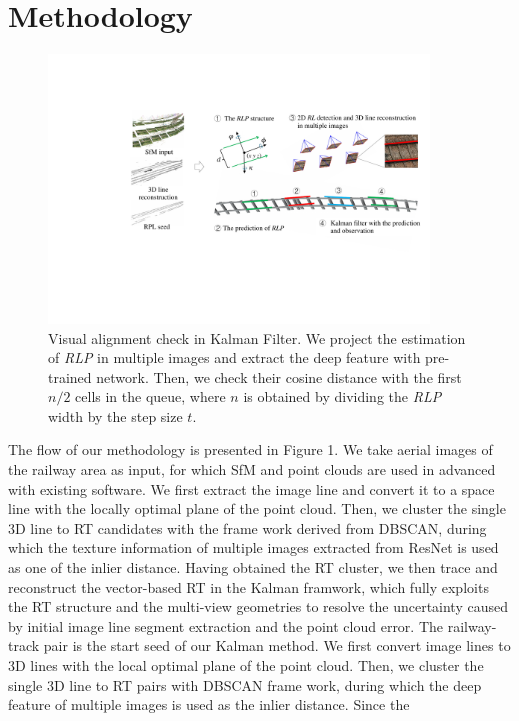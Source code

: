 \section{Methodology}
\begin{figure}
    \centering
    \includegraphics[width=0.9\textwidth]{images/overview.pdf}
    \caption{Visual alignment check in Kalman Filter.
    We project the estimation of \textit{RLP} in multiple images and extract the deep feature with pre-trained network.
    Then, 
    we check their cosine distance with the first $n/2$ cells in the queue,
    where $n$ is obtained by dividing the \textit{RLP} width by the step size $t$.}
    \label{fig_visualCheck}
\end{figure}
The flow of our methodology is presented in Figure 1.
We take aerial images of the railway area as input,
for which SfM and point clouds are used in advanced with existing software.
We first extract the image line and convert it to a space line with the locally optimal plane of the point cloud.
Then,
we cluster the single 3D line to RT candidates with the frame work derived from DBSCAN,  
during which the texture information of multiple images extracted from ResNet is used as one of the inlier distance.
Having obtained the RT cluster, 
we then trace and reconstruct the vector-based RT in the Kalman framwork,
which fully exploits the RT structure and the multi-view geometries to resolve the uncertainty caused by initial image line segment extraction and the point cloud error.
The railway-track pair is the start seed of our Kalman method.
We first convert image lines to 3D lines with the local optimal plane of the point cloud.
Then,
we cluster the single 3D line to RT pairs with DBSCAN frame work,  
during which the deep feature of multiple images is used as the inlier distance.
Since the 

